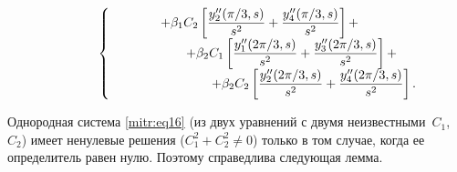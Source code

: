 \begin{equation}
\begin{cases}
\displaystyle \qquad \qquad 

+\beta_1 C_2\left[\frac{y''_2(\pi/3,s)}{s^2} +\frac{y''_4(\pi/3,s)}{s^2}\right]+ \\

\displaystyle \qquad \qquad \qquad 

+

\beta_2 C_1\left[\frac{y''_1({2\pi}/3,s)}{s^2} +\frac{y''_3({2\pi}/3,s)}{s^2}\right]+\\

\displaystyle \qquad \qquad \qquad \qquad 

+\beta_2 C_2\left[\frac{y''_2({2\pi}/3,s)}{s^2} +\frac{y''_4({2\pi}/3,s)}{s^2}\right].

\end{cases} \hspace{-15mm}

\end{equation}





Однородная система \eqref{mitr:eq16} (из двух уравнений с двумя неизвестными~$C_1$,~$C_2$) имеет ненулевые решения ($C^2_1+C^2_2 \ne0$) только в том случае, когда ее определитель равен нулю. Поэтому справедлива следующая лемма.



\smallskip



